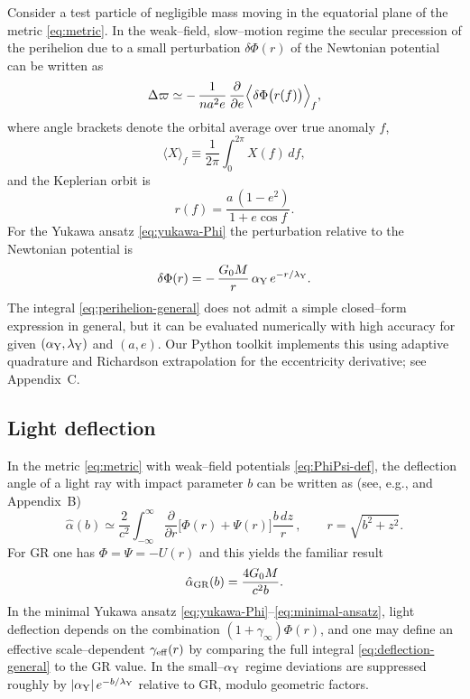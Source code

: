 \documentclass[11pt,a4paper]{article}
\begin{document}
Consider a test particle of negligible mass moving in the equatorial plane of the metric \eqref{eq:metric}. In the weak--field, slow--motion regime the secular precession of the perihelion due to a small perturbation $\delta\Phi(r)$ of the Newtonian potential can be written as \cite{AdkinsMcDonnell2007}
\begin{equation}
\Delta\varpi \simeq -\,\frac{1}{n a^2 e}\,\frac{\partial}{\partial e}\Bigl\langle \delta\Phi\bigl(r(f)\bigr)\Bigr\rangle_f,
\label{eq:perihelion-general}
\end{equation}
where angle brackets denote the orbital average over true anomaly $f$,
\begin{equation}
\langle X\rangle_f \equiv \frac{1}{2\pi}\int_0^{2\pi} X(f)\,df,
\end{equation}
and the Keplerian orbit is
\begin{equation}
r(f) = \frac{a\,(1-e^2)}{1+e\cos f}.
\end{equation}
For the Yukawa ansatz \eqref{eq:yukawa-Phi} the perturbation relative to the Newtonian potential is
\begin{equation}
\delta\Phi(r) = -\,\frac{G_0 M}{r}\,\alpha_{\rm Y}\,e^{-r/\lambda_{\rm Y}}.
\end{equation}
The integral \eqref{eq:perihelion-general} does not admit a simple closed--form expression in general, but it can be evaluated numerically with high accuracy for given $(\alpha_{\rm Y},\lambda_{\rm Y})$ and $(a,e)$. Our Python toolkit implements this using adaptive quadrature and Richardson extrapolation for the eccentricity derivative; see Appendix~C.

\subsection{Light deflection}

In the metric \eqref{eq:metric} with weak--field potentials \eqref{eq:PhiPsi-def}, the deflection angle of a light ray with impact parameter $b$ can be written as (see, e.g., \cite{Will2014,Wald1984} and Appendix~B)
\begin{equation}
\hat{\alpha}(b) \simeq \frac{2}{c^2}\int_{-\infty}^{\infty} 
\frac{\partial}{\partial r}\bigl[\Phi(r)+\Psi(r)\bigr]\frac{b\,dz}{r} \,,
\qquad r = \sqrt{b^2 + z^2}.
\label{eq:deflection-general}
\end{equation}
For GR one has $\Phi=\Psi=-U(r)$ and this yields the familiar result
\begin{equation}
\hat{\alpha}_{\rm GR}(b) = \frac{4 G_0 M}{c^2 b}.
\end{equation}
In the minimal Yukawa ansatz \eqref{eq:yukawa-Phi}--\eqref{eq:minimal-ansatz}, light deflection depends on the combination $(1+\gamma_\infty)\Phi(r)$, and one may define an effective scale--dependent $\gamma_{\rm eff}(r)$ by comparing the full integral \eqref{eq:deflection-general} to the GR value. In the small--$\alpha_{\rm Y}$ regime deviations are suppressed roughly by $|\alpha_{\rm Y}|\,e^{-b/\lambda_{\rm Y}}$ relative to GR, modulo geometric factors.
\end{document}
